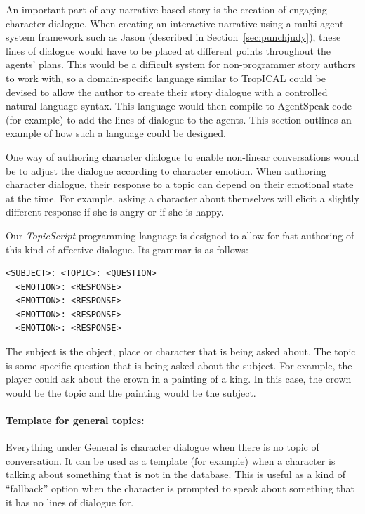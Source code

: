 \documentclass[11pt]{report}
\begin{document}
An important part of any narrative-based story is the creation of engaging
character dialogue. When creating an interactive narrative using a multi-agent
system framework such as Jason (described in
Section~\ref{sec:punchjudy}), these lines of dialogue would have to be
placed at different points throughout the agents' plans. This would be a difficult
system for non-programmer story authors to work with, so a domain-specific
language similar to TropICAL could be devised to allow the author to create
their story dialogue with a controlled natural language syntax. This language
would then compile to AgentSpeak code (for example) to add the lines of dialogue to
the agents. This section outlines an example of how such a language could be designed.

One way of authoring character dialogue to enable non-linear conversations would
be to adjust the dialogue according to character emotion. When authoring character dialogue, their response to a topic can depend on their
emotional state at the time. For example, asking a character about themselves will elicit a slightly different response if she is angry or if she is happy.

Our \emph{TopicScript} programming language is designed to allow for fast
authoring of this kind of affective dialogue. Its grammar is as follows:

\begin{lstlisting}
<SUBJECT>: <TOPIC>: <QUESTION>
  <EMOTION>: <RESPONSE>
  <EMOTION>: <RESPONSE>
  <EMOTION>: <RESPONSE>
  <EMOTION>: <RESPONSE>
\end{lstlisting}

The subject is the object, place or character that is being asked about. The
topic is some specific question that is being asked about the subject. For
example, the player could ask about the crown in a painting of a king. In this
case, the crown would be the topic and the painting would be the subject.

\paragraph{Template for general topics:}

Everything under General is character dialogue when there is no topic of
conversation. It can be used as a template (for example) when a character is
talking about something that is not in the database. This is useful as a kind of
``fallback'' option when the character is prompted to speak about something that
it has no lines of dialogue for.
\end{document}
